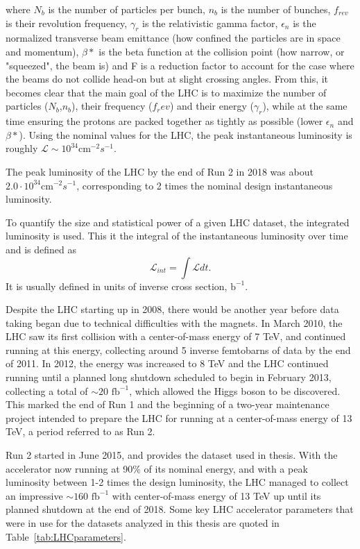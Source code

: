 where $N_b$ is the number of particles per bunch, $n_b$ is the number of bunches, $f_{rev}$ is their revolution frequency, $\gamma_r$ is the relativistic gamma factor, $\epsilon_n$ is the normalized transverse beam emittance (how confined the particles are in space and momentum), $\beta *$ is the beta function at the collision point (how narrow, or "squeezed", the beam is) and F is a reduction factor to account for the case where the beams do not collide head-on but at slight crossing angles.
From this, it becomes clear that the main goal of the LHC is to maximize the number of particles ($N_b$,$n_b$), their frequency ($f_rev$) and their energy ($\gamma_r$), while at the same time ensuring the protons are packed together as tightly as possible (lower $\epsilon_n$ and $\beta *$).
Using the nominal values for the LHC, the peak instantaneous luminosity is roughly $\mathcal L \sim 10^{34} \textrm{cm}^{-2} s^{-1}$. 


The peak luminosity of the LHC by the end of Run 2 in 2018 was about $2.0 \cdot 10^{34} \textrm{cm}^{-2} s^{-1}$, corresponding to 2 times the nominal design instantaneous luminosity.

To quantify the size and statistical power of a given LHC dataset, the integrated luminosity is used. This it the integral of the instantaneous luminosity over time and is defined as
\begin{equation}
  \mathcal L_{int} = \int \mathcal L dt.
\end{equation}
It is usually defined in units of inverse cross section, $\textrm{b}^{-1}$.


Despite the LHC starting up in 2008, there would be another year before data taking began due to technical difficulties with the magnets. In March 2010, the LHC saw its first collision with a center-of-mass energy of 7 TeV, and continued running at this energy, collecting around 5 inverse femtobarns of data by the end of 2011. In 2012, the energy was increased to 8 TeV and the LHC continued running until a planned long shutdown scheduled to begin in February 2013, collecting a total of $\sim 20 \textrm{ fb}^{-1}$, which allowed the Higgs boson to be discovered. This marked the end of Run 1 and the beginning of a two-year maintenance project intended to prepare the LHC for running at a center-of-mass energy of 13 TeV, a period referred to as Run 2.

Run 2 started in June 2015, and provides the dataset used in thesis. With the accelerator now running at 90\% of its nominal energy, and with a peak luminosity between 1-2 times the design luminosity, the LHC managed to collect an impressive $\sim 160 \textrm{ fb}^{-1}$ with center-of-mass energy of 13 TeV up until its planned shutdown at the end of 2018. Some key LHC accelerator parameters that were in use for the datasets analyzed in this thesis are quoted in Table~\ref{tab:LHCparameters}.

